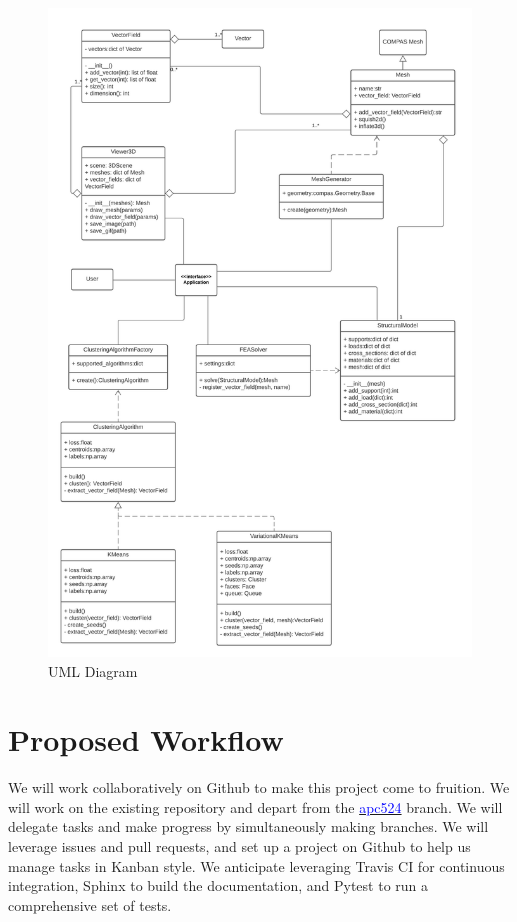 \documentclass[11pt]{article}
\begin{document}
\begin{figure}[H]
    \centering
    \includegraphics[scale=0.57]{UML-Clusters.jpeg}
	\caption{UML Diagram}
	\label{fig:uml}
\end{figure}
\vspace{30mm}

\section{Proposed Workflow}
We will work collaboratively on Github to make this project come to fruition. We will work on the existing repository and depart from the \href{https://github.com/arpastrana/directional_clustering/tree/apc524}{\textcolor{blue}{apc524}} branch. We will delegate tasks and make progress by simultaneously making branches. We will leverage issues and pull requests, and set up a project on Github to help us manage tasks in Kanban style. We anticipate leveraging Travis CI for continuous integration, Sphinx to build the documentation, and Pytest to run a comprehensive set of tests.
\end{document}
